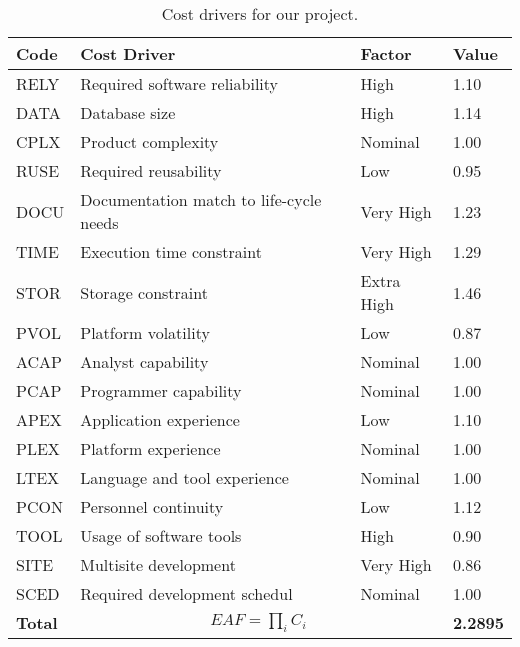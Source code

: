 \begin{table}[H]
    \centering
    \begin{tabular}{| l | l | l | l |}
        \hline
        \textbf{Code}   & \textbf{Cost Driver}             & \textbf{Factor}   & \textbf{Value}    \\
        \hline
        RELY            & Required software reliability           & High               &    1.10             \\
        \hline
        DATA            & Database size   & High           &      1.14         \\
        \hline
        CPLX            & Product complexity           &   Nominal              &    1.00            \\
        \hline
        RUSE            & Required reusability             &   Low         &       0.95          \\
        \hline
        DOCU            & Documentation match to life-cycle needs         & Very High              &   1.23              \\
        \hline
        TIME            & Execution time constraint        & Very High              &   1.29            \\
        \hline
        STOR            & Storage constraint        & Extra High              &   1.46           \\
        \hline
        PVOL            & Platform volatility       & Low              &   0.87           \\
        \hline
        ACAP            & Analyst capability       & Nominal              &   1.00         \\
        \hline
        PCAP            & Programmer capability      & Nominal              &   1.00         \\
        \hline
        APEX            & Application experience      & Low              &   1.10         \\
        \hline
        PLEX            & Platform experience      & Nominal              &   1.00         \\
        \hline
        LTEX            & Language and tool experience     & Nominal              &   1.00         \\
        \hline
        PCON            & Personnel continuity      & Low              &   1.12         \\
        \hline
        TOOL            & Usage of software tools      & High              &   0.90         \\
        \hline
        SITE            & Multisite development      & Very High              &   0.86         \\
        \hline
        SCED            & Required development schedul      & Nominal              &   1.00         \\
        \hline
        \textbf{Total}  & \multicolumn{2}{|c|}{$EAF=\prod_i C_i$}          &  \textbf{2.2895}     \\
        \hline
    \end{tabular}
    \caption{Cost drivers for our project.}
    \label{tab:cost-drivers}
\end{table}

